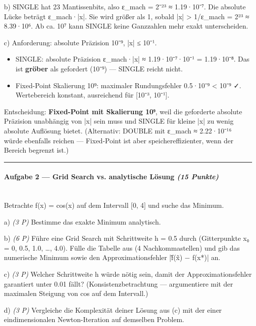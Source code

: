 \documentclass[11pt, a4paper]{article}
\begin{document}
b) SINGLE hat 23 Mantissenbits, also ε\_mach = 2⁻²³ ≈ 1.19·10⁻⁷. Die absolute Lücke beträgt ε\_mach·|x|. Sie wird größer als 1, sobald |x| > 1/ε\_mach = 2²³ ≈ 8.39·10⁶. Ab ca. 10⁷ kann SINGLE keine Ganzzahlen mehr exakt unterscheiden.


c) Anforderung: absolute Präzision 10⁻⁹, |x| ≤ 10⁻¹.

\begin{itemize}
  \item SINGLE: absolute Präzision ε\_mach·|x| ≈ 1.19·10⁻⁷·10⁻¹ = 1.19·10⁻⁸. Das ist \textbf{gröber} als gefordert (10⁻⁹) — SINGLE reicht nicht.
  \item Fixed-Point Skalierung 10⁹: maximaler Rundungsfehler 0.5·10⁻⁹ < 10⁻⁹ ✓. Wertebereich konstant, ausreichend für [10⁻³, 10⁻¹].
\end{itemize}

Entscheidung: \textbf{Fixed-Point mit Skalierung 10⁹}, weil die geforderte absolute Präzision unabhängig von |x| sein muss und SINGLE für kleine |x| zu wenig absolute Auflösung bietet. (Alternativ: DOUBLE mit ε\_mach ≈ 2.22·10⁻¹⁶ würde ebenfalls reichen — Fixed-Point ist aber speichereffizienter, wenn der Bereich begrenzt ist.)



\noindent\textcolor{rulegray}{\rule{\linewidth}{0.4pt}}


\paragraph{Aufgabe 2 — Grid Search vs. analytische Lösung \textit{(15 Punkte)}}\mbox{}\\[2pt]

Betrachte f(x) = cos(x) auf dem Intervall [0, 4] und suche das Minimum.


a) \textit{(3 P)} Bestimme das exakte Minimum analytisch.


b) \textit{(6 P)} Führe eine Grid Search mit Schrittweite h = 0.5 durch (Gitterpunkte x₀ = 0, 0.5, 1.0, …, 4.0). Fülle die Tabelle aus (4 Nachkommastellen) und gib das numerische Minimum sowie den Approximationsfehler |f̃(x̃) − f(x*)| an.


c) \textit{(3 P)} Welcher Schrittweite h würde nötig sein, damit der Approximationsfehler garantiert unter 0.01 fällt? (Konsistenzbetrachtung — argumentiere mit der maximalen Steigung von cos auf dem Intervall.)


d) \textit{(3 P)} Vergleiche die Komplexität deiner Lösung aus (c) mit der einer eindimensionalen Newton-Iteration auf demselben Problem.
\end{document}
